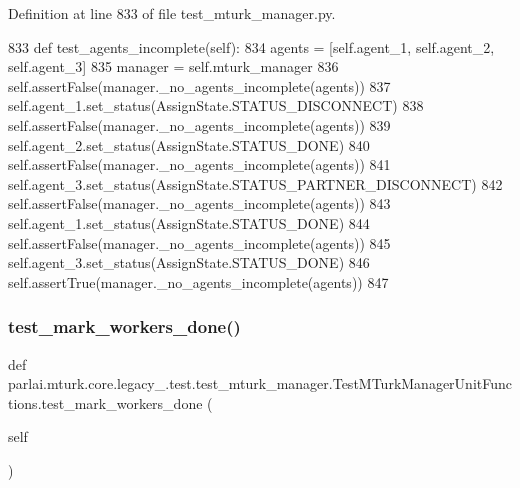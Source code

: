 Definition at line 833 of file test\+\_\+mturk\+\_\+manager.\+py.


\begin{DoxyCode}
833     \textcolor{keyword}{def }test\_agents\_incomplete(self):
834         agents = [self.agent\_1, self.agent\_2, self.agent\_3]
835         manager = self.mturk\_manager
836         self.assertFalse(manager.\_no\_agents\_incomplete(agents))
837         self.agent\_1.set\_status(AssignState.STATUS\_DISCONNECT)
838         self.assertFalse(manager.\_no\_agents\_incomplete(agents))
839         self.agent\_2.set\_status(AssignState.STATUS\_DONE)
840         self.assertFalse(manager.\_no\_agents\_incomplete(agents))
841         self.agent\_3.set\_status(AssignState.STATUS\_PARTNER\_DISCONNECT)
842         self.assertFalse(manager.\_no\_agents\_incomplete(agents))
843         self.agent\_1.set\_status(AssignState.STATUS\_DONE)
844         self.assertFalse(manager.\_no\_agents\_incomplete(agents))
845         self.agent\_3.set\_status(AssignState.STATUS\_DONE)
846         self.assertTrue(manager.\_no\_agents\_incomplete(agents))
847 
\end{DoxyCode}
\mbox{\label{classparlai_1_1mturk_1_1core_1_1legacy__2018_1_1test_1_1test__mturk__manager_1_1TestMTurkManagerUnitFunctions_ae3cac1da2b18fda9e1e06482a592d430}} 
\subsubsection{\texorpdfstring{test\+\_\+mark\+\_\+workers\+\_\+done()}{test\_mark\_workers\_done()}}
{\footnotesize\ttfamily def parlai.\+mturk.\+core.\+legacy\+\_.\+test.\+test\+\_\+mturk\+\_\+manager.\+Test\+M\+Turk\+Manager\+Unit\+Functions.\+test\+\_\+mark\+\_\+workers\+\_\+done (\begin{DoxyParamCaption}\item[{}]{self }\end{DoxyParamCaption})}




